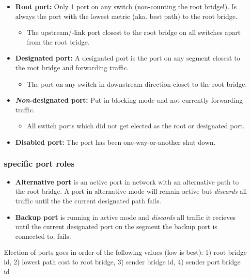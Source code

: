\begin{itemize}
	\item \textbf{Root port:} Only 1 port on any switch (non-counting the root bridge!). Is always the port with the lowest metric (aka. best path) to the root bridge.
    \begin{itemize}
        \item The upstream/-link port closest to the root bridge on all switches apart from the root bridge.
    \end{itemize}
	\item \textbf{Designated port:} A designated port is the port on any segment closest to the root bridge and forwarding traffic.
    \begin{itemize}
        \item The port on any switch in downstream direction closet to the root bridge.
    \end{itemize}
	\item \textbf{\textit{Non}-designated port:} Put in blocking mode and not currently forwarding traffic.
    \begin{itemize}
        \item All switch ports which did not get elected as the root or designated port.
    \end{itemize}
	\item \textbf{Disabled port:} The port has been one-way-or-another shut down.
\end{itemize}

\subsubsection{specific port roles}
\begin{itemize}
	\item \textbf{Alternative port} is an active port in network with an alternative path to the root bridge. A port in alternative mode will remain active but \textit{discards} all traffic until the the current designated path fails.
	\item \textbf{Backup port} is running in active mode and \textit{discards} all traffic it recieves until the current designated port on the segment the backup port is connected to, fails.
\end{itemize}

Election of ports goes in order of the following values (low is best): 1) root bridge id, 2) lowest path cost to root bridge, 3) sender bridge id, 4) sender port bridge id

